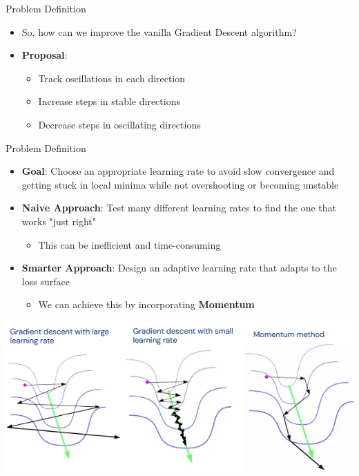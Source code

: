 \documentclass[serif, aspectratio=169]{beamer}
\begin{document}
\begin{frame}{Problem Definition}
    \begin{itemize}
        \item So, how can we improve the vanilla Gradient Descent algorithm? 
        \item \textbf{Proposal}:
        \begin{itemize}
            \item Track oscillations in each direction
            \item Increase steps in stable directions
            \item Decrease steps in oscillating directions
        \end{itemize}
    \end{itemize}
\end{frame}


\begin{frame}{Problem Definition}
    \begin{itemize}
        \item \textbf{Goal}: Choose an appropriate learning rate to avoid slow convergence and getting stuck in local minima while not overshooting or becoming unstable
        \item \textbf{Naive Approach}: Test many different learning rates to find the one that works "just right"
        \begin{itemize}
            \item This can be inefficient and time-consuming
        \end{itemize}
        \item \textbf{Smarter Approach}: Design an adaptive learning rate that adapts to the loss surface
        \begin{itemize}
            \item We can achieve this by incorporating \textbf{Momentum}
        \end{itemize}
    \end{itemize}
    \vfill
    \begin{center}
        \includegraphics[width=0.6\linewidth]{pic/compare_momentum.png}
    \end{center}
\end{frame}
\end{document}
